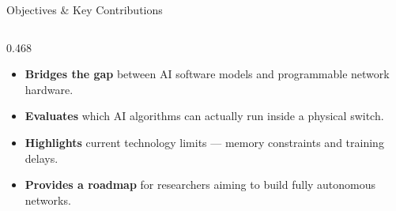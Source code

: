 {\begin{frame}{Objectives \& Key Contributions}
\begin{columns}[T, totalwidth=\textwidth]
\begin{column}{0.468\textwidth}
      \begin{itemize}
        \setlength\itemsep{8pt}
        \footnotesize

        \item[\textcolor{solutiongreen}{\bfseries 01}]
          \textbf{Bridges the gap} between AI software
          models and programmable network hardware.

        \item[\textcolor{solutiongreen}{\bfseries 02}]
          \textbf{Evaluates} which AI algorithms can
          actually run inside a physical switch.

        \item[\textcolor{solutiongreen}{\bfseries 03}]
          \textbf{Highlights} current technology limits
          --- memory constraints and training delays.

        \item[\textcolor{solutiongreen}{\bfseries 04}]
          \textbf{Provides a roadmap} for researchers
          aiming to build fully autonomous networks.

      \end{itemize}
    \end{column}

  \end{columns}

\end{frame}
}
